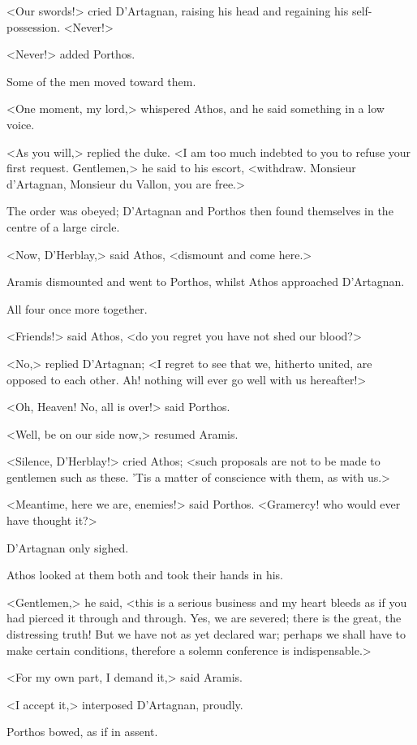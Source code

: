 <Our swords!> cried D'Artagnan, raising his head and regaining his self-possession. <Never!>

<Never!> added Porthos.

Some of the men moved toward them.

<One moment, my lord,> whispered Athos, and he said something in a low voice.

<As you will,> replied the duke. <I am too much indebted to you to refuse your first request. Gentlemen,> he said to his escort, <withdraw. Monsieur d'Artagnan, Monsieur du Vallon, you are free.>

The order was obeyed; D'Artagnan and Porthos then found themselves in the centre of a large circle.

<Now, D'Herblay,> said Athos, <dismount and come here.>

Aramis dismounted and went to Porthos, whilst Athos approached D'Artagnan.

All four once more together.

<Friends!> said Athos, <do you regret you have not shed our blood?>

<No,> replied D'Artagnan; <I regret to see that we, hitherto united, are opposed to each other. Ah! nothing will ever go well with us hereafter!>

<Oh, Heaven! No, all is over!> said Porthos.

<Well, be on our side now,> resumed Aramis.

<Silence, D'Herblay!> cried Athos; <such proposals are not to be made to gentlemen such as these. 'Tis a matter of conscience with them, as with us.>

<Meantime, here we are, enemies!> said Porthos. <Gramercy! who would ever have thought it?>

D'Artagnan only sighed.

Athos looked at them both and took their hands in his.

<Gentlemen,> he said, <this is a serious business and my heart bleeds as if you had pierced it through and through. Yes, we are severed; there is the great, the distressing truth! But we have not as yet declared war; perhaps we shall have to make certain conditions, therefore a solemn conference is indispensable.>

<For my own part, I demand it,> said Aramis.

<I accept it,> interposed D'Artagnan, proudly.

Porthos bowed, as if in assent.

